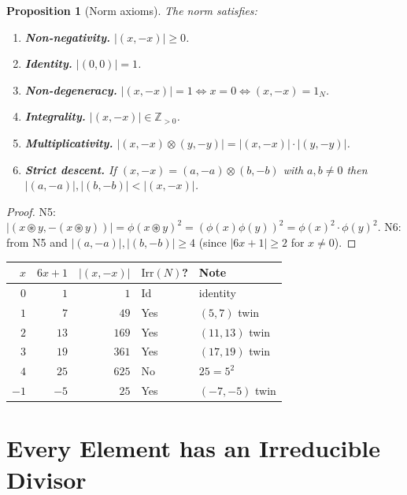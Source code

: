 \documentclass[11pt,a4paper]{amsart}
\theoremstyle{plain}
\newtheorem{proposition}[theorem]{Proposition}
\theoremstyle{definition}
\theoremstyle{remark}
\newcommand{\mstar}{\mathbin{\circledast}}  %
\newcommand{\tens}{\mathbin{\otimes}}       %
\newcommand{\Z}{\mathbb{Z}}
\newcommand{\Irr}{\mathrm{Irr}}
\newcommand{\phii}{\phi}                   %
\begin{document}
\begin{proposition}[Norm axioms]
The norm satisfies:
\begin{enumerate}[label=\textbf{N\arabic*.},leftmargin=*]
\item \textbf{Non-negativity.} $|(x,-x)| \geq 0$.
\item \textbf{Identity.} $|(0,0)| = 1$.
\item \textbf{Non-degeneracy.} $|(x,-x)| = 1 \iff x = 0 \iff (x,-x) = 1_N$.
\item \textbf{Integrality.} $|(x,-x)| \in \Z_{>0}$.
\item \textbf{Multiplicativity.}
  $|(x,-x) \tens (y,-y)| = |(x,-x)| \cdot |(y,-y)|$.
\item \textbf{Strict descent.} If $(x,-x) = (a,-a) \tens (b,-b)$ with
  $a,b \neq 0$ then $|(a,-a)|, |(b,-b)| < |(x,-x)|$.
\end{enumerate}
\end{proposition}

\begin{proof}
N5: $|(x \mstar y, -(x \mstar y))| = \phii(x \mstar y)^2 = (\phii(x)\phii(y))^2 = \phii(x)^2 \cdot \phii(y)^2$.
N6: from N5 and $|(a,-a)|, |(b,-b)| \geq 4$ (since $|6x+1| \geq 2$ for $x \neq 0$).
\end{proof}

\begin{center}
\begin{tabular}{rrrll}
\toprule
$x$ & $6x+1$ & $|(x,-x)|$ & $\Irr(N)$? & Note \\
\midrule
$0$  & $1$   & $1$    & Id  & identity \\
$1$  & $7$   & $49$   & Yes & $(5,7)$ twin \\
$2$  & $13$  & $169$  & Yes & $(11,13)$ twin \\
$3$  & $19$  & $361$  & Yes & $(17,19)$ twin \\
$4$  & $25$  & $625$  & No  & $25=5^2$ \\
$-1$ & $-5$  & $25$   & Yes & $(-7,-5)$ twin \\
\bottomrule
\end{tabular}
\end{center}

\section{Every Element has an Irreducible Divisor}
\end{document}
